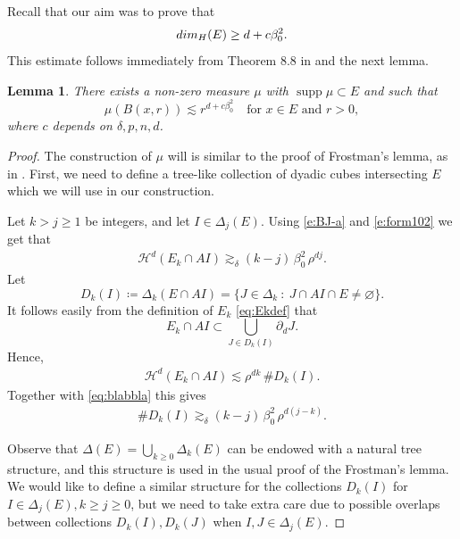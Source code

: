 \documentclass[11pt,reqno]{amsart}
\renewcommand{\d}{{\partial}}
\newtheorem{lemma}[theorem]{Lemma}
\theoremstyle{definition}
\theoremstyle{remark}
\numberwithin{equation}{section}
\newcommand{\hd}{\mathcal{H}^d}
\DeclareMathOperator{\supp}{supp}
\theoremstyle{theorem}
\theoremstyle{definition}
\theoremstyle{remark}
\numberwithin{equation}{section}
\begin{document}
	Recall that our aim was to prove that
	\begin{align*}
	{\rm dim}_H(E) \ge d+ c\beta_0^2.
	\end{align*}
	This estimate follows immediately from Theorem 8.8 in \cite{mattila} and the next lemma.
	\begin{lemma}
		There exists a non-zero measure $\mu$ with $\supp\mu\subset E$ and such that
		\begin{equation*}
		\mu(B(x,r))\lesssim r^{d+ c\beta_0^2}\quad\text{for $x\in E$ and $r>0$},
		\end{equation*}
		where $c$ depends on $\delta, p, n, d$.
	\end{lemma} 
\begin{proof}
	The construction of $\mu$ will is similar to the proof of Frostman's lemma, as in \cite[Theorem 8.8]{mattila}. First, we need to define a tree-like collection of dyadic cubes intersecting $E$ which we will use in our construction.
	
	Let $k> j \ge 1$ be integers, and let $I\in\Delta_j(E)$. Using \eqref{e:BJ-a} and \eqref{e:form102} we get that
	\begin{align}\label{eq:blabbla}
	\hd(E_k\cap AI) \gtrsim_\delta (k-j) \, \beta_0^2 \, \rho^{dj}.
	\end{align}	
	Let 
	\begin{equation*}
	D_k(I)\coloneqq\Delta_{k}(E\cap AI) = \{J\in\Delta_{k}\ :\ J\cap AI\cap E\neq\varnothing  \}.
	\end{equation*}
%
%
%
%
	It follows easily from the definition of $E_k$ \eqref{eq:Ekdef} that 
	\begin{equation*}
	E_k\cap AI \subset \bigcup_{J\in D_k(I)}\d_d J.
	\end{equation*}
	Hence,
	\begin{align*}
	\hd(E_k \cap AI) \lesssim \rho^{dk}\, \#D_k(I).
	\end{align*}
	Together with \eqref{eq:blabbla} this gives
	\begin{align} \label{e:CardA}
	\#D_k(I) \gtrsim_\delta (k-j) \, \beta_0^2\, \rho^{d(j-k)}.
	\end{align}
	
	Observe that $\Delta(E)=\bigcup_{k\ge 0}\Delta_k(E)$ can be endowed with a natural tree structure, and this structure is used in the usual proof of the Frostman's lemma. We would like to define a similar structure for the collections $D_k(I)$ for $I\in \Delta_j(E), k\ge j\ge 0$, but we need to take extra care due to possible overlaps between collections $D_k(I), D_k(J)$ when $I,J\in\Delta_j(E)$. 
	

\end{proof}
\end{document}
